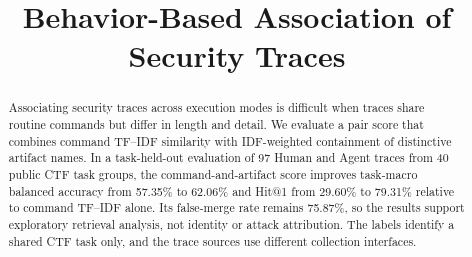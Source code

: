 \documentclass[10pt]{article}
\title{Behavior-Based Association of Security Traces}
\author{}
\date{}
\begin{document}
\maketitle

\begin{abstract}
Associating security traces across execution modes is difficult when traces share routine commands but differ in length and detail. We evaluate a pair score that combines command TF--IDF similarity with IDF-weighted containment of distinctive artifact names. In a task-held-out evaluation of 97 Human and Agent traces from 40 public CTF task groups, the command-and-artifact score improves task-macro balanced accuracy from 57.35\% to 62.06\% and Hit@1 from 29.60\% to 79.31\% relative to command TF--IDF alone. Its false-merge rate remains 75.87\%, so the results support exploratory retrieval analysis, not identity or attack attribution. The labels identify a shared CTF task only, and the trace sources use different collection interfaces.
\end{abstract}




\appendix

\end{document}
